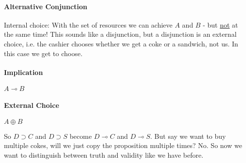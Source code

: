 \documentclass[12 pt]{article}
\begin{document}
    \paragraph{Alternative Conjunction} Internal choice: With the set
    of resources we can achieve $A$ and $B$ - but \underline{not} at
    the same time! This sounds like a disjunction, but a disjunction
    is an external choice, i.e. the cashier chooses whether we get a
    coke or a sandwich, not us. In this case we get to choose.
    \begin{prooftree}
    \end{prooftree}
    \begin{prooftree}
    \end{prooftree}
    \begin{prooftree}
    \end{prooftree}
    \paragraph{Implication} $A \multimap B$
    \begin{prooftree}
    \end{prooftree}
    \begin{prooftree}
    \end{prooftree}
    \paragraph{External Choice} $A \oplus B$
    \begin{prooftree}
    \end{prooftree}
    \begin{prooftree}
    \end{prooftree}
    \begin{prooftree}
    \end{prooftree}
    So $D \supset C$ and $D \supset S$ become $D \multimap C$ and $D
    \multimap S$. But say we want to buy multiple cokes, will we just
    copy the proposition multiple times? No. So now we want to
    distinguish between truth and validity like we have before.
\end{document}
